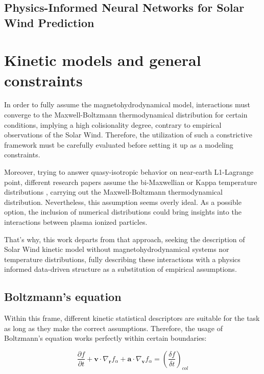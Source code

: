 \documentclass[12pt]{article}
\begin{document}
\subsection{Physics-Informed Neural Networks for Solar Wind Prediction}

\cite{johnson2022physics}

\section{Kinetic models and general constraints}
In order to fully assume the magnetohydrodynamical model, interactions must converge to the Maxwell-Boltzmann thermodynamical distribution for certain conditions, implying a high colisionality degree, contrary to empirical observations of the Solar Wind. Therefore, the utilization of such a constrictive framework must be carefully evaluated before setting it up as a modeling constraints.

Moreover, trying to answer quasy-isotropic behavior on near-earth L1-Lagrange point, different research papers assume the bi-Maxwellian or Kappa temperature distributions \cite{Stansby_2018, Nicolaou_2018, Zouganelis_2004}, carrying out the Maxwell-Boltzmann thermodynamical distribution. Nevertheless, this assumption seems overly ideal. As a possible option, the inclusion of numerical distributions could bring insights into the interactions between plasma ionized particles.

That's why, this work departs from that approach, seeking the description of Solar Wind kinetic model without magnetohydrodynamical systems nor temperature distributions, fully describing these interactions with a physics informed data-driven structure as a substitution of empirical assumptions.

\subsection{Boltzmann's equation}
Within this frame, different kinetic statistical descriptors are suitable for the task as long as they make the correct assumptions. Therefore, the usage of Boltzmann's equation works perfectly within certain boundaries:

\begin{equation}
    \frac{\partial f}{\partial t} + \mathbf{v} \cdot \nabla_{\mathbf{r}} f_\alpha + \mathbf{a} \cdot \nabla_{\mathbf{v}} f_\alpha= \left(\frac{\delta f}{\delta t}\right)_{col}
\end{equation}
\end{document}
